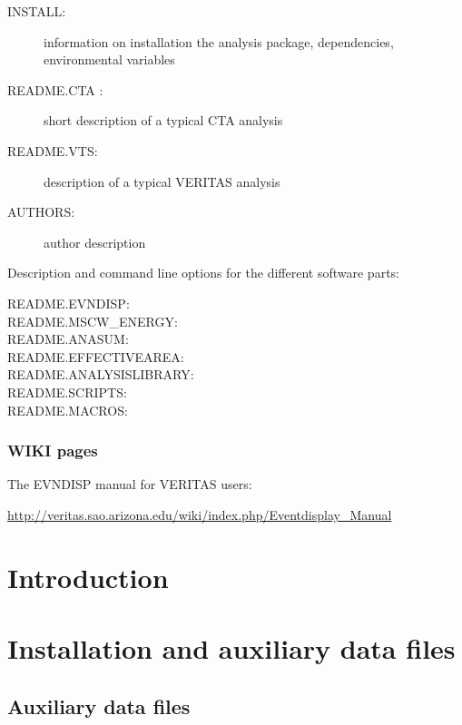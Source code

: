 \documentclass[titlepage,a4paper,twoside,11pt]{report}
\newcommand{\clearemptydoublepage}{\newpage{\pagestyle{empty}\cleardoublepage}}
\begin{document}
\begin{description}
\item[INSTALL:]   information on installation the analysis package, dependencies, environmental variables
\item[README.CTA :]  short description of a typical CTA analysis
\item[README.VTS:]      description of a typical VERITAS analysis
\item[AUTHORS:]		author description
\end{description}

\noindent Description and command line options for the different software parts:

\begin{description}
\item[README.EVNDISP:]
\item[README.MSCW\_ENERGY:]
\item[README.ANASUM:]
\item[README.EFFECTIVEAREA:]
\item[README.ANALYSISLIBRARY:]
\item[README.SCRIPTS:]
\item[README.MACROS:]
\end{description}

\subsection*{WIKI pages}

The EVNDISP manual for VERITAS users: 

\url{http://veritas.sao.arizona.edu/wiki/index.php/Eventdisplay\_Manual}

\clearemptydoublepage

\chapter{Introduction}

%
%

\chapter{Installation and auxiliary data files}

\section{Auxiliary data files}
\label{SECTION.AUXFILE}
\end{document}
